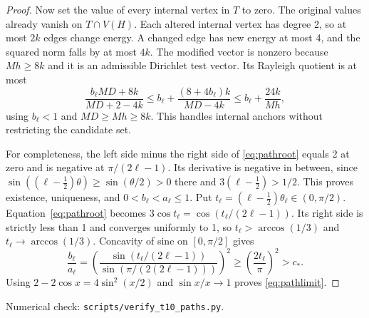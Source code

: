 \documentclass[11pt]{article}
\begin{document}
\begin{proof}
Now set the value of every internal vertex in $T$ to zero. The
original values already vanish on $T\cap V(H)$. Each altered
internal vertex has degree 2, so at most $2k$ edges change energy.
A changed edge has new energy at most 4, and the squared norm
falls by at most $4k$. The modified vector is nonzero because
$M h\geq8k$ and it is an admissible Dirichlet test vector. Its
Rayleigh quotient is at most
\[
 \frac{b_\ell MD+8k}{MD+2-4k}
 \leq b_\ell+\frac{(8+4b_\ell)k}{MD-4k}
 \leq b_\ell+\frac{24k}{Mh},
\]
using $b_\ell<1$ and $MD\geq Mh\geq8k$.
This handles internal anchors without restricting the candidate set.

For completeness, the left side minus the right side of
\eqref{eq:pathroot} equals 2 at zero and is negative at
$\pi/(2\ell-1)$. Its derivative is negative in between, since
$\sin((\ell-\tfrac12)\theta)\geq\sin(\theta/2)>0$ there and
$3(\ell-\tfrac12)>1/2$. This proves existence, uniqueness, and
$0<b_\ell<a_\ell\leq1$. Put
$t_\ell=(\ell-\tfrac12)\theta_\ell\in(0,\pi/2)$.
Equation~\eqref{eq:pathroot} becomes
$3\cos t_\ell=\cos(t_\ell/(2\ell-1))$.
Its right side is strictly less than 1 and converges uniformly to 1,
so $t_\ell>\arccos(1/3)$ and
$t_\ell\to\arccos(1/3)$. Concavity of sine on $[0,\pi/2]$ gives
\[
 \frac{b_\ell}{a_\ell}
 =\left(\frac{\sin(t_\ell/(2\ell-1))}
 {\sin(\pi/(2(2\ell-1)))}\right)^2
 \geq\left(\frac{2t_\ell}{\pi}\right)^2>c_*.
\]
Using $2-2\cos x=4\sin^2(x/2)$
and $\sin x/x\to1$ proves \eqref{eq:pathlimit}.
\end{proof}
\noindent Numerical check: \texttt{scripts/verify\_t10\_paths.py}.
\end{document}
